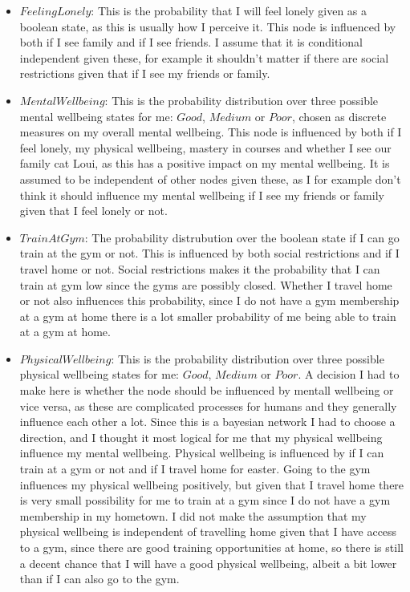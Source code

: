 \documentclass[11pt, a4paper, english]{../Template/NTNUoving}
\begin{document}
\begin{oppgave}
\begin{itemize}
        \item $FeelingLonely$: This is the probability that I will feel lonely given as a boolean state, as this is usually how I perceive it. This node is influenced by both if I see family and if I see friends. I assume that it is conditional independent given these, for example it shouldn't matter
        if there are social restrictions given that if I see my friends or family.
        \item $MentalWellbeing$: This is the probability distribution over three possible mental wellbeing states for me: $Good$, $Medium$ or $Poor$, chosen as discrete measures on my overall mental wellbeing. This node is influenced by
        both if I feel lonely, my physical wellbeing, mastery in courses and whether I see our family cat Loui, as this has a positive impact on my mental wellbeing. It is assumed to be independent of other nodes given these, as I for example don't think it should influence my mental wellbeing if I see my friends or family
        given that I feel lonely or not.
        \item $TrainAtGym$: The probability distrubution over the boolean state if I can go train at the gym or not. This is influenced
        by both social restrictions and if I travel home or not. Social restrictions makes it the probability that I can train at gym low since the gyms are possibly closed.
        Whether I travel home or not also influences this probability, since I do not have a gym membership at a gym at home there is a lot smaller probability of me being able to
        train at a gym at home.
        \item $PhysicalWellbeing$: This is the probability distribution over three possible physical wellbeing states for me: $Good$, $Medium$ or $Poor$.
        A decision I had to make here is whether the node should be influenced by mentall wellbeing or vice versa, as these are complicated processes for humans and they generally
        influence each other a lot. Since this is a bayesian network I had to choose a direction, and I thought it most logical for me that my physical wellbeing influence my mental wellbeing.
        Physical wellbeing is influenced by if I can train at a gym or not and if I travel home for easter. Going to the gym influences my physical wellbeing
        positively, but given that I travel home there is very small possibility for me to train at a gym since I do not have a gym membership in my hometown.
        I did not make the assumption that my physical wellbeing is independent of travelling home given that I have access to a gym, since
        there are good training opportunities at home, so there is still a decent chance that I will have a good physical wellbeing, albeit a bit lower than if I can also go to the gym.
    \end{itemize}


\end{oppgave}
\end{document}
